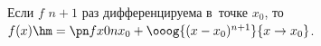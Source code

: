 
    Если $f$ $n+1$ раз дифференцируема в~точке $x_0$, то $f(x)\hm=\pn fx0n{x_0}+\ooog{(x-x_0)^{n+1}}{x\to x_0}$.
